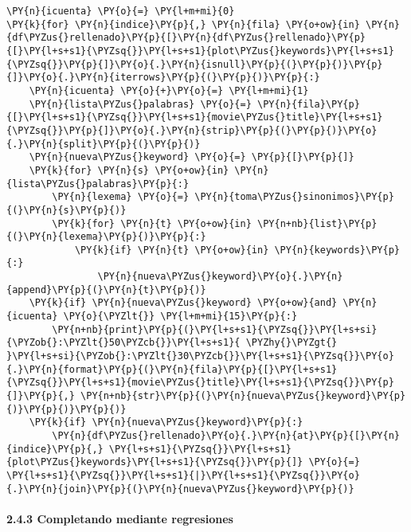     \begin{tcolorbox}[breakable, size=fbox, boxrule=1pt, pad at break*=1mm,colback=cellbackground, colframe=cellborder]
\begin{Verbatim}[commandchars=\\\{\}]
\PY{n}{icuenta} \PY{o}{=} \PY{l+m+mi}{0}
\PY{k}{for} \PY{n}{indice}\PY{p}{,} \PY{n}{fila} \PY{o+ow}{in} \PY{n}{df\PYZus{}rellenado}\PY{p}{[}\PY{n}{df\PYZus{}rellenado}\PY{p}{[}\PY{l+s+s1}{\PYZsq{}}\PY{l+s+s1}{plot\PYZus{}keywords}\PY{l+s+s1}{\PYZsq{}}\PY{p}{]}\PY{o}{.}\PY{n}{isnull}\PY{p}{(}\PY{p}{)}\PY{p}{]}\PY{o}{.}\PY{n}{iterrows}\PY{p}{(}\PY{p}{)}\PY{p}{:}
    \PY{n}{icuenta} \PY{o}{+}\PY{o}{=} \PY{l+m+mi}{1}
    \PY{n}{lista\PYZus{}palabras} \PY{o}{=} \PY{n}{fila}\PY{p}{[}\PY{l+s+s1}{\PYZsq{}}\PY{l+s+s1}{movie\PYZus{}title}\PY{l+s+s1}{\PYZsq{}}\PY{p}{]}\PY{o}{.}\PY{n}{strip}\PY{p}{(}\PY{p}{)}\PY{o}{.}\PY{n}{split}\PY{p}{(}\PY{p}{)}
    \PY{n}{nueva\PYZus{}keyword} \PY{o}{=} \PY{p}{[}\PY{p}{]}
    \PY{k}{for} \PY{n}{s} \PY{o+ow}{in} \PY{n}{lista\PYZus{}palabras}\PY{p}{:}
        \PY{n}{lexema} \PY{o}{=} \PY{n}{toma\PYZus{}sinonimos}\PY{p}{(}\PY{n}{s}\PY{p}{)}
        \PY{k}{for} \PY{n}{t} \PY{o+ow}{in} \PY{n+nb}{list}\PY{p}{(}\PY{n}{lexema}\PY{p}{)}\PY{p}{:}
            \PY{k}{if} \PY{n}{t} \PY{o+ow}{in} \PY{n}{keywords}\PY{p}{:} 
                \PY{n}{nueva\PYZus{}keyword}\PY{o}{.}\PY{n}{append}\PY{p}{(}\PY{n}{t}\PY{p}{)}                
    \PY{k}{if} \PY{n}{nueva\PYZus{}keyword} \PY{o+ow}{and} \PY{n}{icuenta} \PY{o}{\PYZlt{}} \PY{l+m+mi}{15}\PY{p}{:} 
        \PY{n+nb}{print}\PY{p}{(}\PY{l+s+s1}{\PYZsq{}}\PY{l+s+si}{\PYZob{}:\PYZlt{}50\PYZcb{}}\PY{l+s+s1}{ \PYZhy{}\PYZgt{} }\PY{l+s+si}{\PYZob{}:\PYZlt{}30\PYZcb{}}\PY{l+s+s1}{\PYZsq{}}\PY{o}{.}\PY{n}{format}\PY{p}{(}\PY{n}{fila}\PY{p}{[}\PY{l+s+s1}{\PYZsq{}}\PY{l+s+s1}{movie\PYZus{}title}\PY{l+s+s1}{\PYZsq{}}\PY{p}{]}\PY{p}{,} \PY{n+nb}{str}\PY{p}{(}\PY{n}{nueva\PYZus{}keyword}\PY{p}{)}\PY{p}{)}\PY{p}{)}
    \PY{k}{if} \PY{n}{nueva\PYZus{}keyword}\PY{p}{:}
        \PY{n}{df\PYZus{}rellenado}\PY{o}{.}\PY{n}{at}\PY{p}{[}\PY{n}{indice}\PY{p}{,} \PY{l+s+s1}{\PYZsq{}}\PY{l+s+s1}{plot\PYZus{}keywords}\PY{l+s+s1}{\PYZsq{}}\PY{p}{]} \PY{o}{=} \PY{l+s+s1}{\PYZsq{}}\PY{l+s+s1}{|}\PY{l+s+s1}{\PYZsq{}}\PY{o}{.}\PY{n}{join}\PY{p}{(}\PY{n}{nueva\PYZus{}keyword}\PY{p}{)}
\end{Verbatim}
\end{tcolorbox}

    \hypertarget{completando-mediante-regresiones}{%
\paragraph{2.4.3 Completando mediante
regresiones}\label{completando-mediante-regresiones}}

